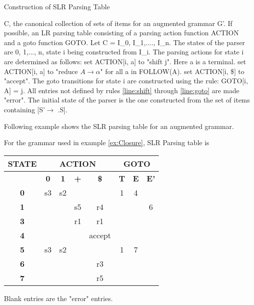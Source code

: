 \begin{algorithm}
\caption{Construction of SLR Parsing Table}
\label{algo:SLR Parsing Table}

\begin{algorithmic}[1]
\Require C, the canonical collection of sets of items for an augmented grammar G'.
\Ensure If possible, an LR parsing table consisting of a parsing action function ACTION and a goto function GOTO.
\Statex Let C = {I_0, I_1,...., I_n}. The states of the parser are 0, 1,..., n, state i being constructed from I_i. The parsing actions for state i are determined as follows:
 \label{line:shift}
\State set ACTION[i, a] to "shift j". Here a is a terminal.
\EndIf
{}
\State set ACTION[i, a] to "reduce $A\rightarrow\alpha$" for all a in FOLLOW(A).
\EndIf
{}
\State set ACTION[i, \$] to "accept".
\EndIf
\Statex The goto transitions for state i are constructed using the rule:
\State GOTO[i, A] = j.
\EndIf  \label{line:goto}
\State All entries not defined by rules \ref{line:shift} through \ref{line:goto} are made "error".
\State The initial state of the parser is the one constructed from the set of items containing [S'$\rightarrow$ .S].
\end{algorithmic}
\end{algorithm}

Following example shows the SLR parsing table for an augmented grammar.
\begin{example}
\label{ex:SLR table}
For the grammar used in example \ref{ex:Closure}, SLR Parsing table is
\begin{center}
\begin{tabular}{ |c|c|c|c|c|c|c|c| }
 \hline
 \textbf{STATE} & \multicolumn{4}{c}{\textbf{ACTION}} & \multicolumn{3}{|c|}{\textbf{GOTO}}\\
 \hline
  & \textbf{0} & \textbf{1} & \textbf{+} & \textbf{\$} & \textbf{T} & \textbf{E} & \textbf{E'}\\
 \hline
 \textbf{0} & s3 & s2 &  &  & 1 & 4 & \\
 \hline
 \textbf{1} &  &  & s5 & r4 &  &  & 6\\
 \hline
 \textbf{3} &  &  & r1 & r1 &  &  & \\
 \hline
 \textbf{4} &  &  &  & accept &  &  & \\
 \hline
 \textbf{5} & s3 & s2 &  &  & 1 & 7 & \\
 \hline
 \textbf{6} &  &  &  & r3 &  &  & \\
 \hline
 \textbf{7} &  &  &  & r5 &  &  & \\
 \hline
\end{tabular}
\end{center}
Blank entries are the "error" entries.
\end{example}


